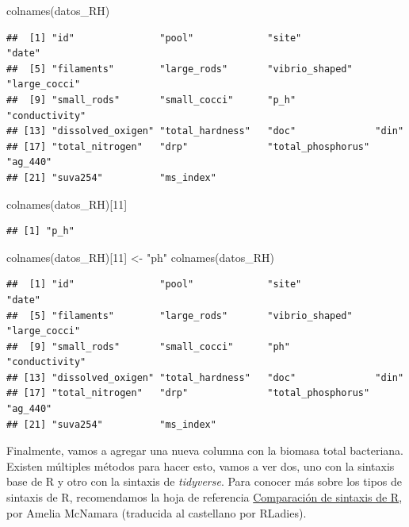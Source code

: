 \documentclass[
]{book}
\newenvironment{Shaded}{\begin{snugshade}}{\end{snugshade}}
\newcommand{\DecValTok}[1]{\textcolor[rgb]{0.00,0.00,0.81}{#1}}
\newcommand{\FunctionTok}[1]{\textcolor[rgb]{0.00,0.00,0.00}{#1}}
\newcommand{\NormalTok}[1]{#1}
\newcommand{\OtherTok}[1]{\textcolor[rgb]{0.56,0.35,0.01}{#1}}
\newcommand{\StringTok}[1]{\textcolor[rgb]{0.31,0.60,0.02}{#1}}
\begin{document}
\begin{Shaded}
\begin{Highlighting}[]
\FunctionTok{colnames}\NormalTok{(datos\_RH)}
\end{Highlighting}
\end{Shaded}

\begin{verbatim}
##  [1] "id"               "pool"             "site"             "date"            
##  [5] "filaments"        "large_rods"       "vibrio_shaped"    "large_cocci"     
##  [9] "small_rods"       "small_cocci"      "p_h"              "conductivity"    
## [13] "dissolved_oxigen" "total_hardness"   "doc"              "din"             
## [17] "total_nitrogen"   "drp"              "total_phosphorus" "ag_440"          
## [21] "suva254"          "ms_index"
\end{verbatim}

\begin{Shaded}
\begin{Highlighting}[]
\FunctionTok{colnames}\NormalTok{(datos\_RH)[}\DecValTok{11}\NormalTok{]}
\end{Highlighting}
\end{Shaded}

\begin{verbatim}
## [1] "p_h"
\end{verbatim}

\begin{Shaded}
\begin{Highlighting}[]
\FunctionTok{colnames}\NormalTok{(datos\_RH)[}\DecValTok{11}\NormalTok{] }\OtherTok{\textless{}{-}} \StringTok{"ph"}
\FunctionTok{colnames}\NormalTok{(datos\_RH)}
\end{Highlighting}
\end{Shaded}

\begin{verbatim}
##  [1] "id"               "pool"             "site"             "date"            
##  [5] "filaments"        "large_rods"       "vibrio_shaped"    "large_cocci"     
##  [9] "small_rods"       "small_cocci"      "ph"               "conductivity"    
## [13] "dissolved_oxigen" "total_hardness"   "doc"              "din"             
## [17] "total_nitrogen"   "drp"              "total_phosphorus" "ag_440"          
## [21] "suva254"          "ms_index"
\end{verbatim}

Finalmente, vamos a agregar una nueva columna con la biomasa total bacteriana. Existen múltiples métodos para hacer esto, vamos a ver dos, uno con la sintaxis base de R y otro con la sintaxis de \emph{tidyverse}. Para conocer más sobre los tipos de sintaxis de R, recomendamos la hoja de referencia \href{https://raw.githubusercontent.com/rstudio/cheatsheets/main/translations/spanish/syntax_es.pdf}{Comparación de sintaxis de R}, por Amelia McNamara (traducida al castellano por RLadies).
\end{document}
